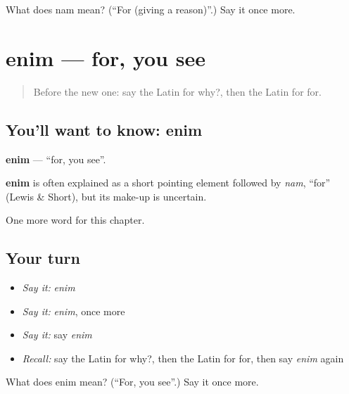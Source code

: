 \begin{tcolorbox}[breakable,colback=teal!4,colframe=teal!35!black,title={Before you move on}]
What does nam mean? (\textquotedblleft{}For (giving a reason)\textquotedblright{}.) Say it once more.
\end{tcolorbox}
\section[enim]{enim — for, you see}

\label{lesson:LA-C113-enim}



\begin{quote}
Before the new one: say the Latin for why?, then the Latin for for.
\end{quote}

\subsection*{You'll want to know: enim}
\textbf{enim} — \textquotedblleft{}for, you see\textquotedblright{}.

\begin{cousinweb}
\textbf{enim} is often explained as a short pointing element followed by \emph{nam}, \textquotedblleft{}for\textquotedblright{} (Lewis \& Short), but its make-up is uncertain.
\end{cousinweb}

\begin{grammarlens}[title={What you've built}]
One more word for this chapter.
\end{grammarlens}

\subsection*{Your turn}
\begin{itemize}
\raggedright
  \item \emph{Say it:} \emph{enim}
  \item \emph{Say it:} \emph{enim}, once more
  \item \emph{Say it:} say \emph{enim}
  \item \emph{Recall:} say the Latin for why?, then the Latin for for, then say \emph{enim} again
\end{itemize}

\begin{tcolorbox}[breakable,colback=teal!4,colframe=teal!35!black,title={Before you move on}]
What does enim mean? (\textquotedblleft{}For, you see\textquotedblright{}.) Say it once more.
\end{tcolorbox}
